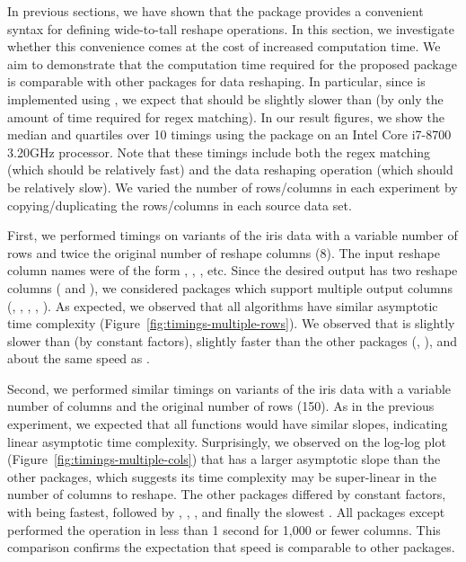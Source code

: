 In previous sections, we have shown that the  package provides
a convenient syntax for defining wide-to-tall reshape operations. In
this section, we investigate whether this convenience comes at the cost
of increased computation time. We aim to demonstrate that the computation
time required for the proposed  package is comparable with
other packages for data reshaping. In particular, since  is
implemented using , we expect that  should be
slightly slower than  (by only the amount of time
required for regex matching). In our result figures, we show the median
and quartiles over 10 timings using the 
package on an Intel Core i7-8700 3.20GHz processor. Note that these
timings include both the regex matching (which should be relatively
fast) and the data reshaping operation (which should be relatively
slow). We varied the number of rows/columns in each experiment by
copying/duplicating the rows/columns in each source data set.



First, we performed timings on variants of the iris data with a
variable number of rows and twice the original number of reshape
columns (8). The input reshape column names were of the form
, ,
, etc. Since the desired output has two reshape
columns ( and ), we considered packages which
support multiple output columns (, ,
, , ).
As expected, we observed that all algorithms have similar
asymptotic time complexity (Figure~\ref{fig:timings-multiple-rows}). We
observed that  is slightly slower than  (by constant
factors), slightly faster than the other packages (,
), and about the same speed as . 

Second, we performed similar timings on variants of the iris data with
a variable number of columns and the original number of rows
(150). As in the previous experiment, we expected that all functions
would have similar slopes, indicating linear asymptotic time
complexity. Surprisingly, we observed on the log-log plot
(Figure~\ref{fig:timings-multiple-cols}) that  has a larger
asymptotic slope than the other packages, which suggests its time
complexity may be super-linear in the number of columns to
reshape. The other packages differed by constant factors, with
 being fastest, followed by , ,
, and finally the slowest . All packages except
 performed the operation in less than 1 second for 1,000 or
fewer columns. This comparison confirms the expectation that 
speed is comparable to other packages.


